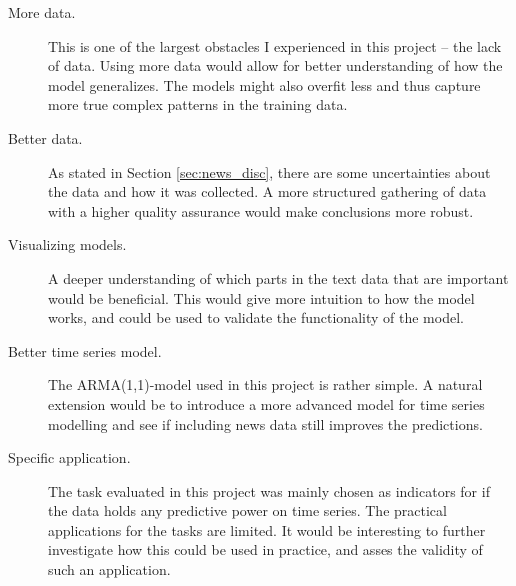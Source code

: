 \begin{description}
    \item[More data.] This is one of the largest obstacles I experienced in this project -- the lack of data. Using more data would allow for better understanding of how the model generalizes. The models might also overfit less and thus capture more true complex patterns in the training data. 
    \item[Better data. ] As stated in Section \ref{sec:news_disc}, there are some uncertainties about the data and how it was collected. A more structured gathering of data with a higher quality assurance would make conclusions more robust. 
    \item[Visualizing models.] A deeper understanding of which parts in the text data that are important would be beneficial. This would give more intuition to how the model works, and could be used to validate the functionality of the model.
    \item[Better time series model.] The ARMA(1,1)-model used in this project is rather simple. A natural extension would be to introduce a more advanced model for time series modelling and see if including news data still improves the predictions. 
    \item[Specific application.] The task evaluated in this project was mainly chosen as indicators for if the data holds any predictive power on time series. The practical applications for the tasks are limited. It would be interesting to further investigate how this could be used in practice, and asses the validity of such an application. 
\end{description}
